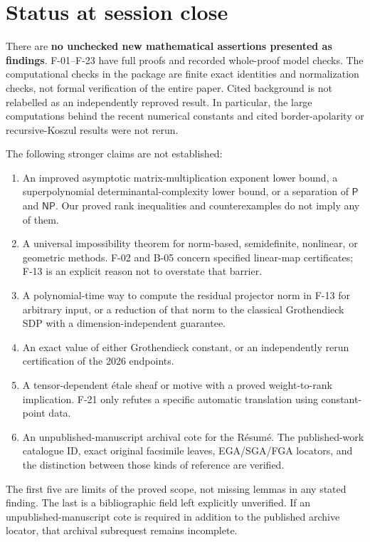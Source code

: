 \documentclass[11pt]{article}
\begin{document}
\section{Status at session close}
There are \textbf{no unchecked new mathematical assertions
presented as findings}. F-01--F-23 have full proofs and
recorded whole-proof model checks. The computational checks
in the package are finite exact identities and normalization
checks, not formal verification of the entire paper.
Cited background is not relabelled as an independently
reproved result. In particular, the large computations behind
the recent numerical constants and cited border-apolarity or
recursive-Koszul results were not rerun.

The following stronger claims are not established:
\begin{enumerate}
\item An improved asymptotic matrix-multiplication exponent
lower bound, a superpolynomial determinantal-complexity lower
bound, or a separation of $\mathsf P$ and $\mathsf{NP}$.
Our proved rank inequalities and counterexamples do not
imply any of them.
\item A universal impossibility theorem for norm-based,
semidefinite, nonlinear, or geometric methods.
F-02 and B-05 concern specified linear-map certificates;
F-13 is an explicit reason not to overstate that barrier.
\item A polynomial-time way to compute the residual
projector norm in F-13 for arbitrary input, or a reduction
of that norm to the classical Grothendieck SDP with a
dimension-independent guarantee.
\item An exact value of either Grothendieck constant, or
an independently rerun certification of the 2026 endpoints.
\item A tensor-dependent \'etale sheaf or motive with a
proved weight-to-rank implication. F-21 only refutes a
specific automatic translation using constant-point data.
\item An unpublished-manuscript archival cote for the
R\'esum\'e. The published-work catalogue ID, exact original
facsimile leaves, EGA/SGA/FGA locators, and the distinction
between those kinds of reference are verified.
\end{enumerate}
The first five are limits of the proved scope, not missing
lemmas in any stated finding. The last is a bibliographic
field left explicitly unverified. If an unpublished-manuscript
cote is required in addition to the published archive
locator, that archival subrequest remains incomplete.
\end{document}
